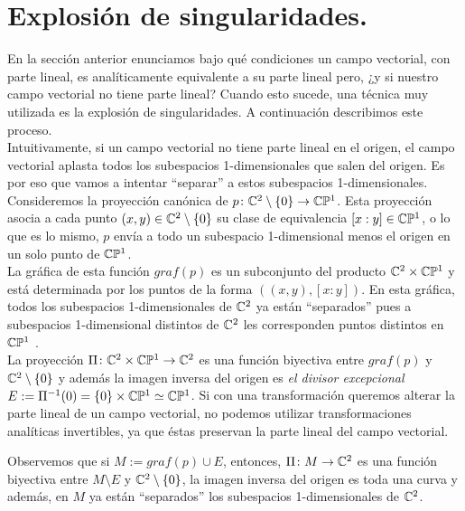 \section{Explosión de singularidades.}  

En la sección anterior enunciamos bajo qué condiciones un campo vectorial, con parte lineal, es analíticamente equivalente a su parte lineal pero, ¿y si nuestro campo vectorial no tiene parte lineal? Cuando esto sucede, una técnica muy utilizada es la explosión de singularidades. A continuación describimos este proceso.\\

Intuitivamente, si un campo vectorial no tiene parte lineal en el origen, el campo vectorial aplasta todos los subespacios 1-dimensionales que salen del origen. Es por eso que vamos a intentar ``separar'' a estos subespacios 1-dimensionales.\\

Consideremos la proyección canónica de $p\colon\mathbb{C}^{2}\setminus\{0\}\rightarrow\mathbb{C}\mathbb{P}^{1}$. Esta proyección asocia a cada punto $(x,y)\in\mathbb{C}^{2}\setminus\{0\}$ su clase de equivalencia $[x:y]\in\mathbb{C}\mathbb{P}^{1}$, o lo que es lo mismo, $p$ envía a todo un subespacio 1-dimensional menos el origen en un solo punto de $\mathbb{C}\mathbb{P}^{1}$.\\

La gráfica de esta función $graf(p)$ es un subconjunto del producto $\mathbb{C}^{2}\times\mathbb{C}\mathbb{P}^{1}$ y está determinada por los puntos de la forma $((x,y),[x:y])$. En esta gráfica, todos los subespacios 1-dimensionales de $\mathbb{C}^{2}$ ya están ``separados'' pues a subespacios 1-dimensional distintos de $\mathbb{C}^{2}$ les corresponden puntos distintos en $\mathbb{C}\mathbb{P}^{1}$ .\\

La proyección $\Pi\colon\mathbb{C}^{2}\times\mathbb{C}\mathbb{P}^{1}\rightarrow\mathbb{C}^{2}$ es una función biyectiva entre $graf(p)$ y $\mathbb{C}^{2}\setminus\{0\}$ y además la imagen inversa del origen es \emph{el divisor excepcional} $E:=\Pi^{-1}(0)=\{0\}\times\mathbb{C}\mathbb{P}^{1}\simeq\mathbb{C}\mathbb{P}^{1}$. Si con una transformación queremos alterar la parte lineal de un campo vectorial, no podemos utilizar transformaciones analíticas invertibles, ya que éstas preservan la parte lineal del campo vectorial.

Observemos que si $M:=graf(p)\cup E$, entonces, $\Pi\colon M\rightarrow\mathbb{C}^{2}$ es una función biyectiva entre $M\setminus E$ y $\mathbb{C}^{2}\setminus\{0\}$, la imagen inversa del origen es toda una curva y además, en $M$ ya están ``separados'' los subespacios 1-dimensionales de $\mathbb{C}^{2}$.\\


